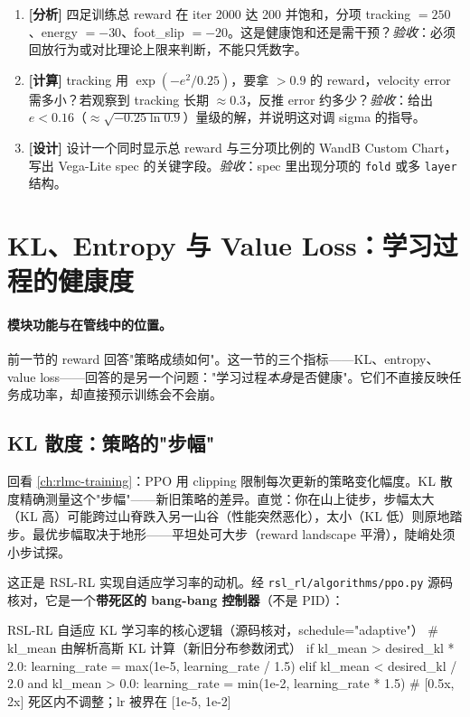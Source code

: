 \begin{practice}[本节动手任务]
\begin{enumerate}
  \item \textbf{[分析]} 四足训练总 reward 在 iter 2000 达 200 并饱和，分项 tracking $=250$、energy $=-30$、foot\_slip $=-20$。这是健康饱和还是需干预？\emph{验收}：必须回放行为或对比理论上限来判断，不能只凭数字。
  \item \textbf{[计算]} tracking 用 $\exp(-e^2/0.25)$，要拿 $>0.9$ 的 reward，velocity error 需多小？若观察到 tracking 长期 $\approx0.3$，反推 error 约多少？\emph{验收}：给出 $e<0.16$（$\approx\sqrt{-0.25\ln0.9}$）量级的解，并说明这对调 sigma 的指导。
  \item \textbf{[设计]} 设计一个同时显示总 reward 与三分项比例的 WandB Custom Chart，写出 Vega-Lite spec 的关键字段。\emph{验收}：spec 里出现分项的 \verb|fold| 或多 \verb|layer| 结构。
\end{enumerate}
\end{practice}

\section{KL、Entropy 与 Value Loss：学习过程的健康度}
\label{sec:rlmc-diag-process}

\paragraph{模块功能与在管线中的位置。}前一节的 reward 回答"策略成绩如何"。这一节的三个指标——KL、entropy、value loss——回答的是另一个问题："学习过程\emph{本身}是否健康"。它们不直接反映任务成功率，却直接预示训练会不会崩。

\subsection{KL 散度：策略的"步幅"}

回看 \cref{ch:rlmc-training}：PPO 用 clipping 限制每次更新的策略变化幅度。KL 散度精确测量这个"步幅"——新旧策略的差异。直觉：你在山上徒步，步幅太大（KL 高）可能跨过山脊跌入另一山谷（性能突然恶化），太小（KL 低）则原地踏步。最优步幅取决于地形——平坦处可大步（reward landscape 平滑），陡峭处须小步试探。

这正是 RSL-RL 实现自适应学习率的动机。经 \verb|rsl_rl/algorithms/ppo.py| 源码核对，它是一个\textbf{带死区的 bang-bang 控制器}（不是 PID）：

\begin{codebox}[Python]{RSL-RL 自适应 KL 学习率的核心逻辑（源码核对，schedule="adaptive"）}
# kl_mean 由解析高斯 KL 计算（新旧分布参数闭式）
if kl_mean > desired_kl * 2.0:
    learning_rate = max(1e-5, learning_rate / 1.5)
elif kl_mean < desired_kl / 2.0 and kl_mean > 0.0:
    learning_rate = min(1e-2, learning_rate * 1.5)
# [0.5x, 2x] 死区内不调整；lr 被界在 [1e-5, 1e-2]
\end{codebox}

